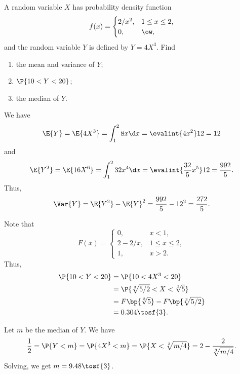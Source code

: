 \begin{problem}
    A random variable $X$ has probability density function \[f(x) = \begin{cases}
        2/x^2, & 1 \leq x \leq 2,\\
        0, & \ow,
    \end{cases}\] and the random variable $Y$ is defined by $Y=4X^{3}$. Find
    \begin{enumerate}
        \item the mean and variance of $Y$;
        \item $\P{10 < Y < 20}$;
        \item the median of $Y$.
    \end{enumerate}
\end{problem}
\begin{solution}
    \begin{ppart}
        We have \[\E{Y} = \E{4X^3} = \int_1^2 8x \d x = \evalint{4x^2}12 = 12\] and \[\E{Y^2} = \E{16X^6} = \int_1^2 32x^4 \d x = \evalint{\frac{32}{5} x^5}12 = \frac{992}{5}.\] Thus, \[\Var{Y} = \E{Y^2} - \E{Y}^2 = \frac{992}{5} - 12^2 = \frac{272}{5}.\]
    \end{ppart}
    \begin{ppart}
        Note that \[F(x) = \begin{cases}
            0, & x < 1,\\
            2-2/x, & 1 \leq x \leq 2,\\
            1, & x > 2.
        \end{cases}\] Thus,
        \begin{align*}
            \P{10 < Y < 20} &= \P{10 < 4X^3 < 20}\\
            &= \P{\sqrt[3]{5/2} < X < \sqrt[3]{5}}\\
            &= F\bp{\sqrt[3]{5}} - F\bp{\sqrt[3]{5/2}}\\
            &= 0.304 \tosf{3}.
        \end{align*}
    \end{ppart}
    \begin{ppart}
        Let $m$ be the median of $Y$. We have \[\frac12 = \P{Y < m} = \P{4X^3 < m} = \P{X < \sqrt[3]{m/4}} = 2 - \frac2{\sqrt[3]{m/4}}.\] Solving, we get $m = 9.48 \tosf{3}$.
    \end{ppart}
\end{solution}